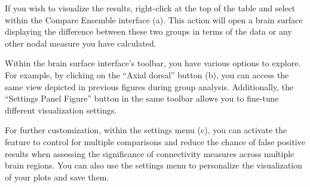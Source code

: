 \documentclass[justified]{tufte-handout}
\begin{document}
If you wish to visualize the results, right-click at the top of the table and select  within the Compare Ensemble interface (a). This action will open a brain surface displaying the difference between these two groups in terms of the  data or any other nodal measure you have calculated.

Within the brain surface interface's toolbar, you have various options to explore. For example, by clicking on the “Axial dorsal” button (b), you can access the same view depicted in previous figures during group analysis. Additionally, the “Settings Panel Figure” button in the same toolbar allows you to fine-tune different visualization settings.

For further customization, within the settings menu (c), you can activate the  feature to control for multiple comparisons and reduce the chance of false positive results when assessing the significance of connectivity measures across multiple brain regions. You can also use the settings menu to personalize the visualization of your plots and save them.
\end{document}
